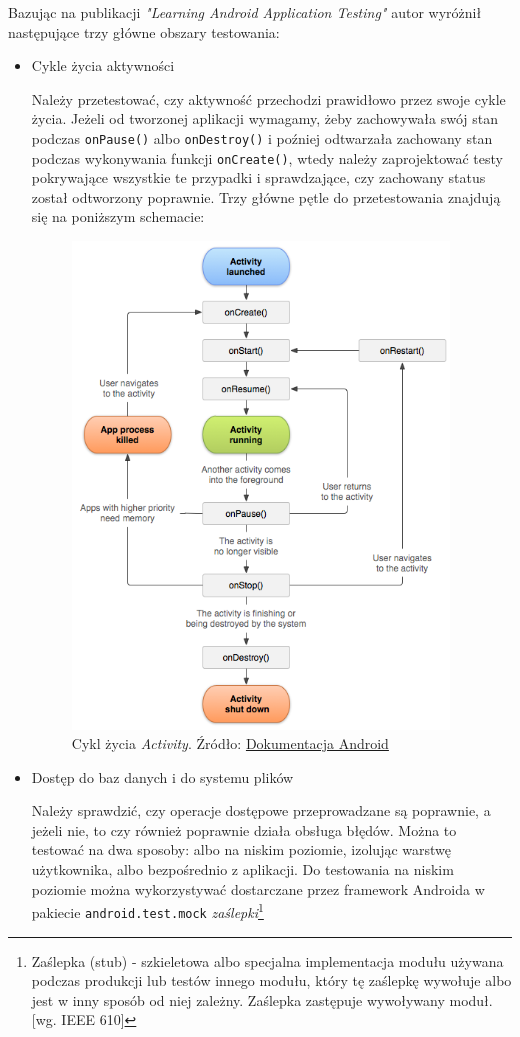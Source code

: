 Bazując na publikacji \textit{"Learning Android Application Testing"\cite{bib:android:testing:learning}} autor wyróżnił następujące trzy główne obszary testowania:

\begin{itemize}
\item{Cykle życia aktywności}

Należy przetestować, czy aktywność przechodzi prawidłowo przez swoje cykle życia. Jeżeli od tworzonej aplikacji wymagamy, żeby zachowywała swój stan podczas \texttt{onPause()} albo \texttt{onDestroy()} i poźniej odtwarzała zachowany stan podczas wykonywania funkcji \texttt{onCreate()}, wtedy należy zaprojektować testy pokrywające wszystkie te przypadki i sprawdzające, czy zachowany status został odtworzony poprawnie. Trzy główne pętle do przetestowania znajdują się na poniższym schemacie:
\begin{figure}[!htb]
    \centering
    \includegraphics[width=10cm]{imgs/ch2_activity_lifecycle.png}
    \caption{Cykl życia \textit{Activity}. Źródło: \href{http://developer.android.com/reference/android/app/Activity.html}{Dokumentacja Android}}
    \label{fig:sample_figure}
\end{figure} 


\item{Dostęp do baz danych i do systemu plików}

Należy sprawdzić, czy operacje dostępowe przeprowadzane są poprawnie, a jeżeli nie, to czy również poprawnie działa obsługa błędów. Można to testować na dwa sposoby: albo na niskim poziomie, izolując warstwę użytkownika, albo bezpośrednio z aplikacji. Do testowania na niskim poziomie można wykorzystywać dostarczane przez framework Androida w pakiecie \texttt{android.test.mock} \textit{zaślepki}\footnote{Zaślepka (stub) - szkieletowa albo specjalna implementacja modułu używana podczas produkcji lub testów innego modułu, który tę zaślepkę wywołuje albo jest w inny sposób od niej zależny. Zaślepka zastępuje wywoływany moduł. [wg. IEEE 610]}


\end{itemize}
